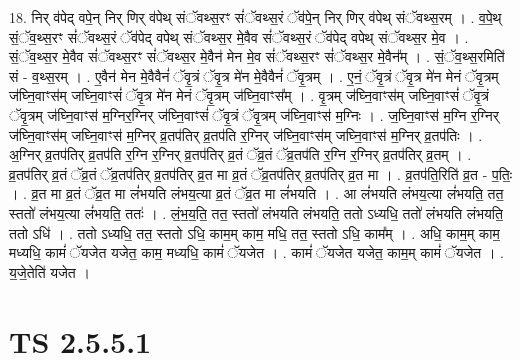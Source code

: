 \documentclass[17pt]{extarticle}
\begin{document}
18. निर् व॑पेद् वपे॒न् निर् णिर् व॑पेथ् संॅवथ्स॒रꣳ सं॑ॅवथ्स॒रं ॅव॑पे॒न् निर् णिर् व॑पेथ् संॅवथ्स॒रम् । . व॒पे॒थ् सं॒ॅव॒थ्स॒रꣳ सं॑ॅवथ्स॒रं ॅव॑पेद् वपेथ् संॅवथ्स॒र मे॒वैव सं॑ॅवथ्स॒रं ॅव॑पेद् वपेथ् संॅवथ्स॒र मे॒व । . सं॒ॅव॒थ्स॒र मे॒वैव सं॑ॅवथ्स॒रꣳ सं॑ॅवथ्स॒र मे॒वैन॑ मेन मे॒व सं॑ॅवथ्स॒रꣳ सं॑ॅवथ्स॒र मे॒वैन᳚म् । . सं॒ॅव॒थ्स॒रमिति॑ सं - व॒थ्स॒रम् । . ए॒वैन॑ मेन मे॒वैवैनं॑ ॅवृ॒त्रं ॅवृ॒त्र मे॑न मे॒वैवैनं॑ ॅवृ॒त्रम् । . ए॒नं॒ ॅवृ॒त्रं ॅवृ॒त्र मे॑न मेनं ॅवृ॒त्रम् ज॑घ्नि॒वाꣳस॑म् जघ्नि॒वाꣳसं॑ ॅवृ॒त्र मे॑न मेनं ॅवृ॒त्रम् ज॑घ्नि॒वाꣳस᳚म् । . वृ॒त्रम् ज॑घ्नि॒वाꣳस॑म् जघ्नि॒वाꣳसं॑ ॅवृ॒त्रं ॅवृ॒त्रम् ज॑घ्नि॒वाꣳस॑ म॒ग्निर॒ग्निर् ज॑घ्नि॒वाꣳसं॑ ॅवृ॒त्रं ॅवृ॒त्रम् ज॑घ्नि॒वाꣳस॑ म॒ग्निः । . ज॒घ्नि॒वाꣳस॑ म॒ग्नि र॒ग्निर् ज॑घ्नि॒वाꣳस॑म् जघ्नि॒वाꣳस॑ म॒ग्निर् व्र॒तप॑तिर् व्र॒तप॑ति र॒ग्निर् ज॑घ्नि॒वाꣳस॑म् जघ्नि॒वाꣳस॑ म॒ग्निर् व्र॒तप॑तिः । . अ॒ग्निर् व्र॒तप॑तिर् व्र॒तप॑ति र॒ग्नि र॒ग्निर् व्र॒तप॑तिर् व्र॒तं ॅव्र॒तं ॅव्र॒तप॑ति र॒ग्नि र॒ग्निर् व्र॒तप॑तिर् व्र॒तम् । . व्र॒तप॑तिर् व्र॒तं ॅव्र॒तं ॅव्र॒तप॑तिर् व्र॒तप॑तिर् व्र॒त मा व्र॒तं ॅव्र॒तप॑तिर् व्र॒तप॑तिर् व्र॒त मा । . व्र॒तप॑ति॒रिति॑ व्र॒त - प॒तिः॒ । . व्र॒त मा व्र॒तं ॅव्र॒त मा लं॑भयति लंभय॒त्या व्र॒तं ॅव्र॒त मा लं॑भयति । . आ लं॑भयति लंभय॒त्या लं॑भयति॒ तत॒ स्ततो॑ लंभय॒त्या लं॑भयति॒ ततः॑ । . लं॒भ॒य॒ति॒ तत॒ स्ततो॑ लंभयति लंभयति॒ ततो ऽध्यधि॒ ततो॑ लंभयति लंभयति॒ ततो ऽधि॑ । . ततो ऽध्यधि॒ तत॒ स्ततो ऽधि॒ काम॒म् काम॒ मधि॒ तत॒ स्ततो ऽधि॒ काम᳚म् । . अधि॒ काम॒म् काम॒ मध्यधि॒ कामं॑ ॅयजेत यजेत॒ काम॒ मध्यधि॒ कामं॑ ॅयजेत । . कामं॑ ॅयजेत यजेत॒ काम॒म् कामं॑ ॅयजेत । . य॒जे॒तेति॑ यजेत । \newline
\pagebreak
{}

\section{ TS 2.5.5.1 }
\end{document}
